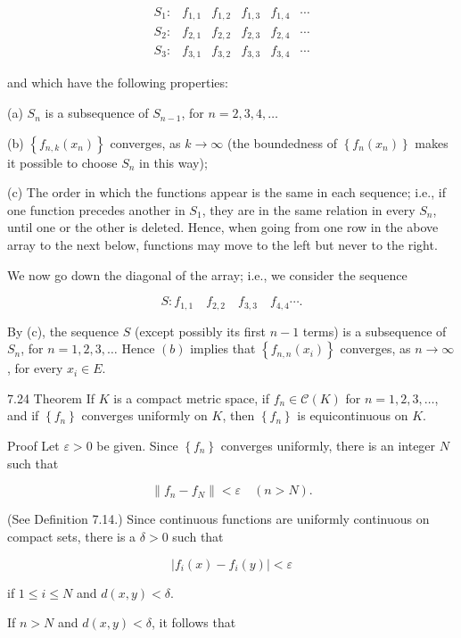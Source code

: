 \documentclass[10pt]{article}
\begin{document}
$$
\begin{array}{llllll}
S_{1}: & f_{1,1} & f_{1,2} & f_{1,3} & f_{1,4} & \cdots \\
S_{2}: & f_{2,1} & f_{2,2} & f_{2,3} & f_{2,4} & \cdots \\
S_{3}: & f_{3,1} & f_{3,2} & f_{3,3} & f_{3,4} & \cdots
\end{array}
$$

and which have the following properties:

(a) $S_{n}$ is a subsequence of $S_{n-1}$, for $n=2,3,4, \ldots$

(b) $\left\{f_{n, k}\left(x_{n}\right)\right\}$ converges, as $k \rightarrow \infty$ (the boundedness of $\left\{f_{n}\left(x_{n}\right)\right\}$ makes it possible to choose $S_{n}$ in this way);

(c) The order in which the functions appear is the same in each sequence; i.e., if one function precedes another in $S_{1}$, they are in the same relation in every $S_{n}$, until one or the other is deleted. Hence, when going from one row in the above array to the next below, functions may move to the left but never to the right.

We now go down the diagonal of the array; i.e., we consider the sequence

$$
S: f_{1,1} \quad f_{2,2} \quad f_{3,3} \quad f_{4,4} \cdots .
$$

By (c), the sequence $S$ (except possibly its first $n-1$ terms) is a subsequence of $S_{n}$, for $n=1,2,3, \ldots$ Hence $(b)$ implies that $\left\{f_{n, n}\left(x_{i}\right)\right\}$ converges, as $n \rightarrow \infty$, for every $x_{i} \in E$.

7.24 Theorem If $K$ is a compact metric space, if $f_{n} \in \mathscr{C}(K)$ for $n=1,2,3, \ldots$, and if $\left\{f_{n}\right\}$ converges uniformly on $K$, then $\left\{f_{n}\right\}$ is equicontinuous on $K$.

Proof Let $\varepsilon>0$ be given. Since $\left\{f_{n}\right\}$ converges uniformly, there is an integer $N$ such that

$$
\left\|f_{n}-f_{N}\right\|<\varepsilon \quad(n>N) .
$$

(See Definition 7.14.) Since continuous functions are uniformly continuous on compact sets, there is a $\delta>0$ such that

$$
\left|f_{i}(x)-f_{i}(y)\right|<\varepsilon
$$

if $1 \leq i \leq N$ and $d(x, y)<\delta$.

If $n>N$ and $d(x, y)<\delta$, it follows that
\end{document}
